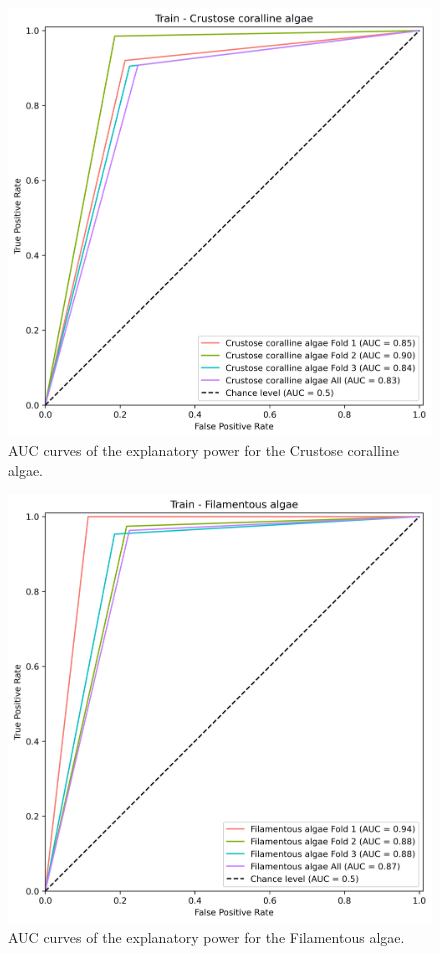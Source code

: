 \begin{figure}
\hypertarget{fig:chap3figS12}{%
\centering
\includegraphics{03-Chapitre3/figures/supplementary/03-receiver_operator_curve_train_rf_Crustose coralline algae.png}
\caption{AUC curves of the explanatory power for the Crustose coralline
algae.}\label{fig:chap3figS12}
}
\end{figure}

\begin{figure}
\hypertarget{fig:chap3figS13}{%
\centering
\includegraphics{03-Chapitre3/figures/supplementary/03-receiver_operator_curve_train_rf_Filamentous algae.png}
\caption{AUC curves of the explanatory power for the Filamentous
algae.}\label{fig:chap3figS13}
}
\end{figure}

